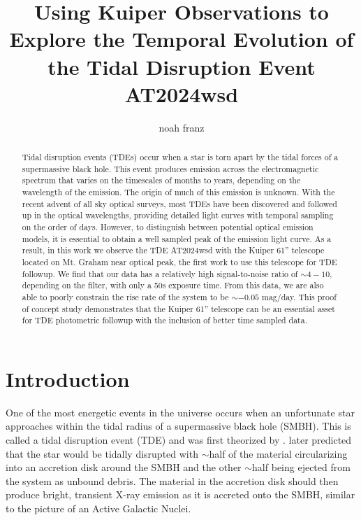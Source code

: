 \documentclass{aastex631}
\begin{document}
\title{Using Kuiper Observations to Explore the Temporal Evolution of the Tidal Disruption Event AT2024wsd}

\author[0000-0003-4537-3575]{noah franz}

\begin{abstract}
  Tidal disruption events (TDEs) occur when a star is torn apart by the tidal forces of a supermassive black hole. This event produces emission across the electromagnetic spectrum that varies on the timescales of months to years, depending on the wavelength of the emission. The origin of much of this emission is unknown. With the recent advent of all sky optical surveys, most TDEs have been discovered and followed up in the optical wavelengths, providing detailed light curves with temporal sampling on the order of days. However, to distinguish between potential optical emission models, it is essential to obtain a well sampled peak of the emission light curve. As a result, in this work we observe the TDE AT2024wsd with the Kuiper 61'' telescope located on Mt. Graham near optical peak, the first work to use this telescope for TDE followup. We find that our data has a relatively high signal-to-noise ratio of $\sim4-10$, depending on the filter, with only a 50s exposure time. From this data, we are also able to poorly constrain the rise rate of the system to be $\sim -0.05$ mag/day. This proof of concept study demonstrates that the Kuiper 61'' telescope can be an essential asset for TDE photometric followup with the inclusion of better time sampled data. 
\end{abstract}

\section{Introduction}
One of the most energetic events in the universe occurs when an unfortunate star approaches within the tidal radius of a supermassive black hole (SMBH). This is called a tidal disruption event (TDE) and was first theorized by \citet{hills1975}. \citet{rees1988} later predicted that the star would be tidally disrupted with $\sim$half of the material circularizing into an accretion disk around the SMBH and the other $\sim$half being ejected from the system as unbound debris. The material in the accretion disk should then produce bright, transient X-ray emission as it is accreted onto the SMBH, similar to the picture of an Active Galactic Nuclei. 
\end{document}

